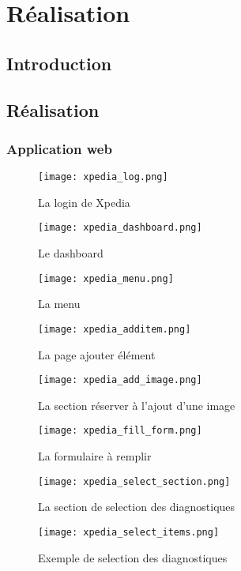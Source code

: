 \chapter{Réalisation}

\section*{Introduction}

\section{Réalisation}
\subsection{Application web}
\begin{figure}[H]
    \centering
    \texttt{[image: xpedia\_log.png]}
    \caption{La login de Xpedia}\label{fig:xpedia_log}
\end{figure}
\begin{figure}[H]
    \centering
    \texttt{[image: xpedia\_dashboard.png]}
    \caption{Le dashboard}\label{fig:xpedia_dashboard}
\end{figure}
\begin{figure}[H]
    \centering
    \texttt{[image: xpedia\_menu.png]}
    \caption{La menu}\label{fig:xpedia_menu}
\end{figure}
\begin{figure}[H]
    \centering
    \texttt{[image: xpedia\_additem.png]}
    \caption{La page ajouter élément}\label{fig:xpedia_additem}
\end{figure}
\begin{figure}[H]
    \centering
    \texttt{[image: xpedia\_add\_image.png]}
    \caption{La section réserver à l'ajout d'une image}\label{fig:xpedia_add_image}
\end{figure}
\begin{figure}[H]
    \centering
    \texttt{[image: xpedia\_fill\_form.png]}
    \caption{La formulaire à remplir}\label{fig:xpedia_fill_form}
\end{figure}
\begin{figure}[H]
    \centering
    \texttt{[image: xpedia\_select\_section.png]}
    \caption{La section de selection des diagnostiques}\label{fig:xpedia_select_section}
\end{figure}
\begin{figure}[H]
    \centering
    \texttt{[image: xpedia\_select\_items.png]}
    \caption{Exemple de selection des diagnostiques}\label{fig:xpedia_select_items}
\end{figure}
